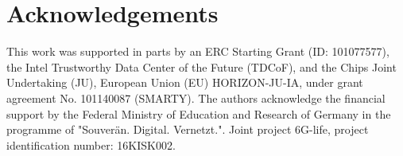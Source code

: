 \fi 

\section*{Acknowledgements}
This work was supported in parts by an ERC Starting Grant (ID: 101077577), the Intel Trustworthy Data Center of the Future (TDCoF), and the Chips Joint Undertaking (JU), European Union (EU) HORIZON-JU-IA, under grant agreement No. 101140087 (SMARTY).
The authors acknowledge the financial support by the Federal Ministry of Education and Research of Germany in the programme of "Souverän. Digital. Vernetzt.". Joint project 6G-life, project identification number: 16KISK002. 
